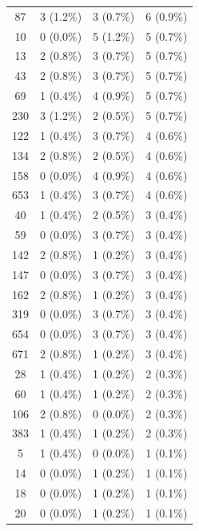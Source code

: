\documentclass{article}
\begin{document}
\begin{table}[hbt!]
{\begin{tabular}{cccc}
87   & 3 (1.2\%)       & 3 (0.7\%)          & 6 (0.9\%)     \\
10   & 0 (0.0\%)       & 5 (1.2\%)          & 5 (0.7\%)     \\
13   & 2 (0.8\%)       & 3 (0.7\%)          & 5 (0.7\%)     \\
43   & 2 (0.8\%)       & 3 (0.7\%)          & 5 (0.7\%)     \\
69   & 1 (0.4\%)       & 4 (0.9\%)          & 5 (0.7\%)     \\
230  & 3 (1.2\%)       & 2 (0.5\%)          & 5 (0.7\%)     \\
122  & 1 (0.4\%)       & 3 (0.7\%)          & 4 (0.6\%)     \\
134  & 2 (0.8\%)       & 2 (0.5\%)          & 4 (0.6\%)     \\
158  & 0 (0.0\%)       & 4 (0.9\%)          & 4 (0.6\%)     \\
653  & 1 (0.4\%)       & 3 (0.7\%)          & 4 (0.6\%)     \\
40   & 1 (0.4\%)       & 2 (0.5\%)          & 3 (0.4\%)     \\
59   & 0 (0.0\%)       & 3 (0.7\%)          & 3 (0.4\%)     \\
142  & 2 (0.8\%)       & 1 (0.2\%)          & 3 (0.4\%)     \\
147  & 0 (0.0\%)       & 3 (0.7\%)          & 3 (0.4\%)     \\
162  & 2 (0.8\%)       & 1 (0.2\%)          & 3 (0.4\%)     \\
319  & 0 (0.0\%)       & 3 (0.7\%)          & 3 (0.4\%)     \\
654  & 0 (0.0\%)       & 3 (0.7\%)          & 3 (0.4\%)     \\
671  & 2 (0.8\%)       & 1 (0.2\%)          & 3 (0.4\%)     \\
28   & 1 (0.4\%)       & 1 (0.2\%)          & 2 (0.3\%)     \\
60   & 1 (0.4\%)       & 1 (0.2\%)          & 2 (0.3\%)     \\
106  & 2 (0.8\%)       & 0 (0.0\%)          & 2 (0.3\%)     \\
383  & 1 (0.4\%)       & 1 (0.2\%)          & 2 (0.3\%)     \\
5    & 1 (0.4\%)       & 0 (0.0\%)          & 1 (0.1\%)     \\
14   & 0 (0.0\%)       & 1 (0.2\%)          & 1 (0.1\%)     \\
18   & 0 (0.0\%)       & 1 (0.2\%)          & 1 (0.1\%)     \\
20   & 0 (0.0\%)       & 1 (0.2\%)          & 1 (0.1\%)     \\

\end{tabular}}
\end{table}
\end{document}
